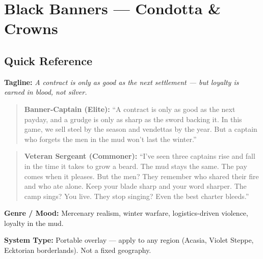 \section{Black Banners --- Condotta \& Crowns}
\label{chap:black-banners}

\subsection*{Quick Reference}
\textbf{Tagline:} \textit{A contract is only as good as the next settlement --- but loyalty is earned in blood, not silver.}

\begin{quote}
  \textbf{Banner-Captain (Elite):}  
  ``A contract is only as good as the next payday, and a grudge is only as sharp as the sword backing it. In this game, we sell steel by the season and vendettas by the year. But a captain who forgets the men in the mud won't last the winter.''
\end{quote}

\begin{quote}
  \textbf{Veteran Sergeant (Commoner):}  
  ``I've seen three captains rise and fall in the time it takes to grow a beard. The mud stays the same. The pay comes when it pleases. But the men? They remember who shared their fire and who ate alone. Keep your blade sharp and your word sharper. The camp sings? You live. They stop singing? Even the best charter bleeds.''
\end{quote}

\noindent\textbf{Genre / Mood:} Mercenary realism, winter warfare, logistics-driven violence, loyalty in the mud.

\noindent\textbf{System Type:} Portable overlay --- apply to any region (Acasia, Violet Steppe, Ecktorian borderlands). Not a fixed geography.

